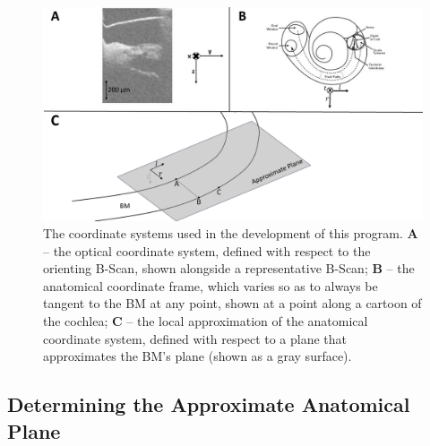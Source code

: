\documentclass[preprint,NumberedRefs]{JASA}
\begin{document}
\begin{figure}[h!]
\centering
\includegraphics[width=\textwidth]{Figure2.pdf}
\caption{The coordinate systems used in the development of this program. \textbf{A} -- the optical coordinate system, defined with respect to the orienting B-Scan, shown alongside a representative B-Scan; \textbf{B} -- the anatomical coordinate frame, which varies so as to always be tangent to the BM at any point, shown at a point along a cartoon of the cochlea; \textbf{C} -- the local approximation of the anatomical coordinate system, defined with respect to a plane that approximates the BM's plane (shown as a gray surface).}
\label{coords}
\end{figure}

\subsection{Determining the Approximate Anatomical Plane}
\end{document}
